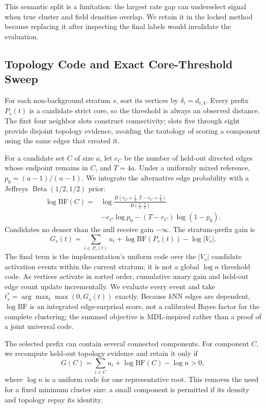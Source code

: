 \documentclass[conference]{IEEEtran}
\begin{document}
This semantic split is a limitation: the largest rate gap can underselect signal when true cluster and field densities overlap. We retain it in the locked method because replacing it after inspecting the final labels would invalidate the evaluation.

\subsection{Topology Code and Exact Core-Threshold Sweep}
For each non-background stratum $s$, sort its vertices by $\delta_i=d_{i,4}$. Every prefix $P_s(t)$ is a candidate strict core, so the threshold is always an observed distance. The first four neighbor slots construct connectivity; slots five through eight provide disjoint topology evidence, avoiding the tautology of scoring a component using the same edges that created it.

For a candidate set $C$ of size $a$, let $e_C$ be the number of held-out directed edges whose endpoint remains in $C$, and $T=4a$. Under a uniformly mixed reference, $p_0=(a-1)/(n-1)$. We integrate the alternative edge probability with a Jeffreys $\operatorname{Beta}(1/2,1/2)$ prior:
\begin{align}
 \log \mathrm{BF}(C)={}&\log\frac{B(e_C+\tfrac12,T-e_C+\tfrac12)}{B(\tfrac12,\tfrac12)} \nonumber\\
 &-e_C\log p_0-(T-e_C)\log(1-p_0).
 \label{eq:bf}
\end{align}
Candidates no denser than the null receive gain $-\infty$. The stratum-prefix gain is
\begin{equation}
 G_s(t)=\sum_{i\in P_s(t)}u_i+\log\mathrm{BF}(P_s(t))-\log |V_s|.
 \label{eq:prefix}
\end{equation}
The final term is the implementation's uniform code over the $|V_s|$ candidate activation events within the current stratum; it is not a global $\log n$ threshold code. As vertices activate in sorted order, cumulative unary gain and held-out edge count update incrementally. We evaluate every event and take $t_s^*=\arg\max_t\max(0,G_s(t))$ exactly. Because $k$NN edges are dependent, $\log\mathrm{BF}$ is an integrated edge-surprisal score, not a calibrated Bayes factor for the complete clustering; the summed objective is MDL-inspired rather than a proof of a joint universal code.

The selected prefix can contain several connected components. For component $C$, we recompute held-out topology evidence and retain it only if
\begin{equation}
 G(C)=\sum_{i\in C}u_i+\log\mathrm{BF}(C)-\log n>0,
 \label{eq:component}
\end{equation}
where $\log n$ is a uniform code for one representative root. This removes the need for a fixed minimum cluster size: a small component is permitted if its density and topology repay its identity.
\end{document}
